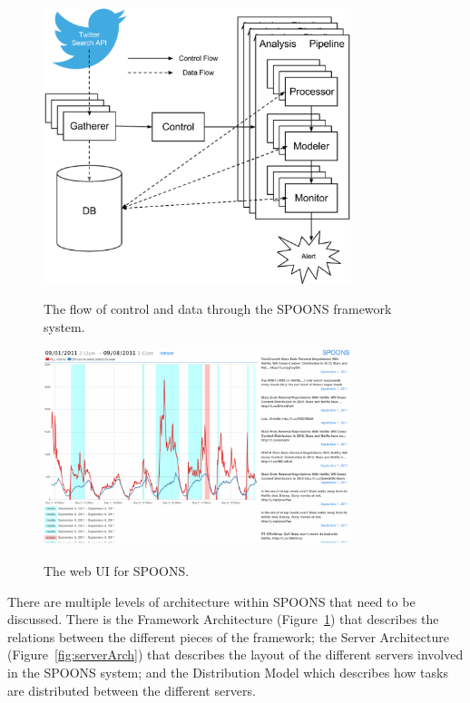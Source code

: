 \documentclass[12pt]{ucthesis}
\newcommand{\captionfonts}{\small\bf\ssp}
\begin{document}
\begin{figure}
   \begin{center}
      \includegraphics[width=0.8\textwidth]{images/SPOONS_Framework_Architecture.eps}
      \captionfonts
      \caption[SPOONS Framework Architecture]{The flow of control and data through the SPOONS framework system.}
      \label{fig:frameworkArch}
   \end{center}
\end{figure}

\begin{figure}
   \begin{center}
      \includegraphics[width=0.8\textwidth]{images/ui.eps}
      \captionfonts
      \caption[SPOONS UI]{The web UI for SPOONS.}
      \label{fig:ui}
   \end{center}
\end{figure}

There are multiple levels of architecture within SPOONS that need to be discussed.
There is the Framework Architecture (Figure~\ref{fig:frameworkArch}) that describes the relations between the
different pieces of the framework; the Server Architecture (Figure~\ref{fig:serverArch}) that describes the layout of
the different servers involved in the SPOONS system; and the Distribution Model which describes how tasks are
distributed between the different servers.
\end{document}
